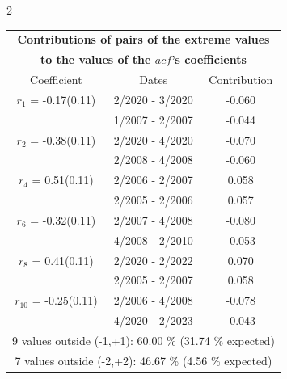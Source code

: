 
\thispagestyle{empty}
\begin{multicols}{2}{ 
\begin{tabular}{ccc}
\multicolumn{3}{c}{\textbf{Contributions of pairs of the extreme values} }  \vspace{-.10in}  \\ 
\multicolumn{3}{c}{ \textbf{to the values of the $acf$'s coefficients}} \\ 
\hline 
\hline                  Coefficient  &  Dates &  Contribution \\ 
\hline 
  $r_{ 1}$ = -0.17(0.11) &       2/2020 -  3/2020 &       -0.060    \vspace{-.10in} \\ 
  &        1/2007 -  2/2007 &       -0.044  \vspace{-.02in}   \\ \hline 
    $r_{ 2}$ = -0.38(0.11) &       2/2020 -  4/2020 &       -0.070    \vspace{-.10in} \\ 
  &        2/2008 -  4/2008 &       -0.060  \vspace{-.02in}   \\ \hline 
    $r_{ 4}$ = 0.51(0.11) &       2/2006 -  2/2007 &        0.058   \vspace{-.10in} \\  
&        2/2005 -  2/2006 &        0.057  \vspace{-.02in} \\ \hline 
  $r_{ 6}$ = -0.32(0.11) &       2/2007 -  4/2008 &       -0.080    \vspace{-.10in} \\ 
  &        4/2008 -  2/2010 &       -0.053  \vspace{-.02in}   \\ \hline 
    $r_{ 8}$ = 0.41(0.11) &       2/2020 -  2/2022 &        0.070   \vspace{-.10in} \\  
&        2/2005 -  2/2007 &        0.058  \vspace{-.02in} \\ \hline 
  $r_{10}$ = -0.25(0.11) &       2/2006 -  4/2008 &       -0.078    \vspace{-.10in} \\ 
  &        4/2020 -  2/2023 &       -0.043  \vspace{-.02in}   \\ \hline 
  \multicolumn{3}{c}{               9 values outside (-1,+1): 60.00  \% (31.74  \% expected)}\vspace{-.10in} \\ 
\multicolumn{3}{c}{               7 values outside (-2,+2): 46.67 \%  (4.56 \% expected) } \\
 \end{tabular} \\ 
 } 
\end{multicols} 
